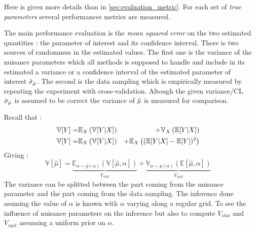 Here is given more details than in \autoref{sec:evaluation_metric}.
For each set of \emph{true parameters} several performances metrics are measured.

The main performance evaluation is the \emph{mean squared error} on the two estimated quantities : the parameter of interest and its confidence interval.
There is two sources of randomness in the estimated values.
The first one is the variance of the nuisance parameters which all methods is supposed to handle and include in its estimated a variance or a confidence interval of the estimated parameter of interest $\hat\sigma_{\hat\mu}$.
The second is the data sampling which is empirically measured by repeating the experiment with cross-validation.
Altough the given variance/CL $\hat\sigma_{\hat\mu}$ is assumed to be correct the variance of $\hat\mu$ is measured for comparison.


Recall that :
\begin{eqnarray}
\label{eq:total_variance_law_2}
    \mathbb{V}[Y] =& \mathbb{E}_X \left (\mathbb{V}[Y|X] \right ) &+ \mathbb{V}_X \left (\mathbb{E}[Y|X]\right ) \\
    \mathbb{V}[Y] =& \mathbb{E}_X \left (\mathbb{V}[Y|X] \right ) &+ \mathbb{E}_X \left ( (\mathbb{E} [Y|X]  - \mathbb{E}[Y])^2\right )
\end{eqnarray}
Giving :
\begin{equation}
\label{eq:stat_and_syst_variance_definition_2}
\mathbb{V}[\hat \mu] 
	= \underbrace{\mathbb{E}_{\alpha \sim p(\alpha)} \left (\mathbb{V}[\hat \mu, \alpha] \right )}_{V_{stat}} 
	+ \underbrace{\mathbb{V}_{\alpha \sim p(\alpha)} \left ( \mathbb{E} [\hat \mu, \alpha] \right )}_{V_{syst}}
\end{equation}
The variance can be splitted between the part coming from the nuisance parameter and the part coming from the data sampling.
The inference done asuming the value of $\alpha$ is known with $\alpha$ varying along a regular grid.
To see the influence of nuisance parameters on the inference but also to compute $V_{stat}$ and $V_{syst}$ assuming a uniform prior on $\alpha$.

